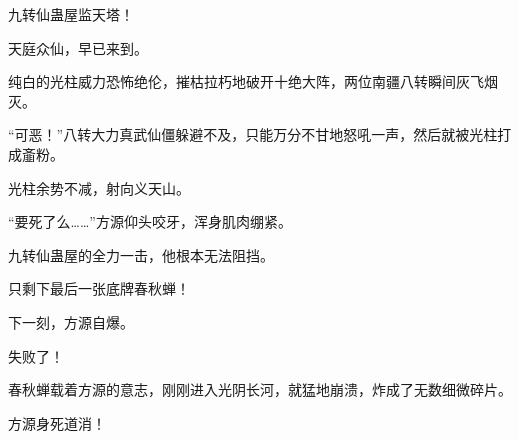 \begin{this_body}
九转仙蛊屋监天塔！

天庭众仙，早已来到。

纯白的光柱威力恐怖绝伦，摧枯拉朽地破开十绝大阵，两位南疆八转瞬间灰飞烟灭。

“可恶！”八转大力真武仙僵躲避不及，只能万分不甘地怒吼一声，然后就被光柱打成齑粉。

光柱余势不减，射向义天山。

“要死了么……”方源仰头咬牙，浑身肌肉绷紧。

九转仙蛊屋的全力一击，他根本无法阻挡。

只剩下最后一张底牌春秋蝉！

下一刻，方源自爆。

失败了！

春秋蝉载着方源的意志，刚刚进入光阴长河，就猛地崩溃，炸成了无数细微碎片。

方源身死道消！

\end{this_body}

